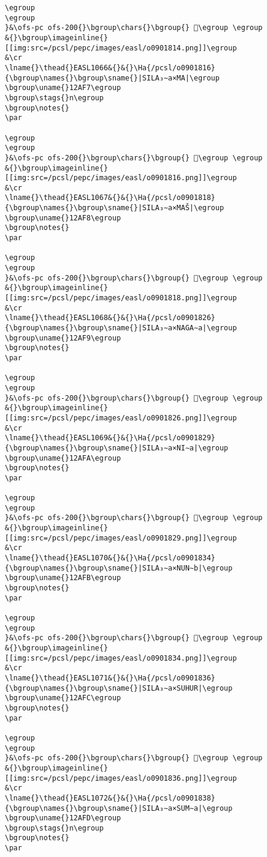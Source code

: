 \begin{verbatim}
\egroup
\egroup
}&\ofs-pc ofs-200{}\bgroup\chars{}\bgroup{} 𒫶\egroup \egroup
&{}\bgroup\imageinline{}[[img:src=/pcsl/pepc/images/easl/o0901814.png]]\egroup
&\cr
\lname{}\thead{}EASL1066&{}&{}\Ha{/pcsl/o0901816}{\bgroup\names{}\bgroup\sname{}|SILA₃∼a×MA|\egroup
\bgroup\uname{}12AF7\egroup
\bgroup\stags{}n\egroup
\bgroup\notes{}
\par 

\egroup
\egroup
}&\ofs-pc ofs-200{}\bgroup\chars{}\bgroup{} 𒫷\egroup \egroup
&{}\bgroup\imageinline{}[[img:src=/pcsl/pepc/images/easl/o0901816.png]]\egroup
&\cr
\lname{}\thead{}EASL1067&{}&{}\Ha{/pcsl/o0901818}{\bgroup\names{}\bgroup\sname{}|SILA₃∼a×MAŠ|\egroup
\bgroup\uname{}12AF8\egroup
\bgroup\notes{}
\par 

\egroup
\egroup
}&\ofs-pc ofs-200{}\bgroup\chars{}\bgroup{} 𒫸\egroup \egroup
&{}\bgroup\imageinline{}[[img:src=/pcsl/pepc/images/easl/o0901818.png]]\egroup
&\cr
\lname{}\thead{}EASL1068&{}&{}\Ha{/pcsl/o0901826}{\bgroup\names{}\bgroup\sname{}|SILA₃∼a×NAGA∼a|\egroup
\bgroup\uname{}12AF9\egroup
\bgroup\notes{}
\par 

\egroup
\egroup
}&\ofs-pc ofs-200{}\bgroup\chars{}\bgroup{} 𒫹\egroup \egroup
&{}\bgroup\imageinline{}[[img:src=/pcsl/pepc/images/easl/o0901826.png]]\egroup
&\cr
\lname{}\thead{}EASL1069&{}&{}\Ha{/pcsl/o0901829}{\bgroup\names{}\bgroup\sname{}|SILA₃∼a×NI∼a|\egroup
\bgroup\uname{}12AFA\egroup
\bgroup\notes{}
\par 

\egroup
\egroup
}&\ofs-pc ofs-200{}\bgroup\chars{}\bgroup{} 𒫺\egroup \egroup
&{}\bgroup\imageinline{}[[img:src=/pcsl/pepc/images/easl/o0901829.png]]\egroup
&\cr
\lname{}\thead{}EASL1070&{}&{}\Ha{/pcsl/o0901834}{\bgroup\names{}\bgroup\sname{}|SILA₃∼a×NUN∼b|\egroup
\bgroup\uname{}12AFB\egroup
\bgroup\notes{}
\par 

\egroup
\egroup
}&\ofs-pc ofs-200{}\bgroup\chars{}\bgroup{} 𒫻\egroup \egroup
&{}\bgroup\imageinline{}[[img:src=/pcsl/pepc/images/easl/o0901834.png]]\egroup
&\cr
\lname{}\thead{}EASL1071&{}&{}\Ha{/pcsl/o0901836}{\bgroup\names{}\bgroup\sname{}|SILA₃∼a×SUHUR|\egroup
\bgroup\uname{}12AFC\egroup
\bgroup\notes{}
\par 

\egroup
\egroup
}&\ofs-pc ofs-200{}\bgroup\chars{}\bgroup{} 𒫼\egroup \egroup
&{}\bgroup\imageinline{}[[img:src=/pcsl/pepc/images/easl/o0901836.png]]\egroup
&\cr
\lname{}\thead{}EASL1072&{}&{}\Ha{/pcsl/o0901838}{\bgroup\names{}\bgroup\sname{}|SILA₃∼a×SUM∼a|\egroup
\bgroup\uname{}12AFD\egroup
\bgroup\stags{}n\egroup
\bgroup\notes{}
\par 


\end{verbatim}
